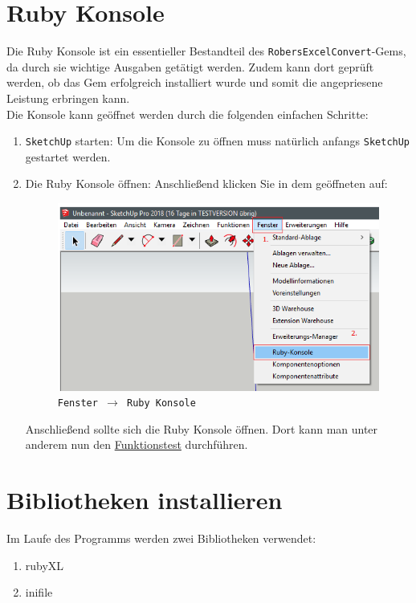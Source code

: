 \documentclass{book}
\newcommand{\sketchup}{\texttt{SketchUp}\xspace}
\newcommand{\robersexcelconvert}{\texttt{RobersExcelConvert}\xspace}
\begin{document}
		\section{Ruby Konsole} \label{Ruby Konsole}
			Die Ruby Konsole ist ein essentieller Bestandteil des \robersexcelconvert-Gems, da durch sie wichtige Ausgaben getätigt werden. Zudem kann dort geprüft werden, ob das Gem erfolgreich installiert wurde und somit die angepriesene Leistung erbringen kann.\\
			Die Konsole kann geöffnet werden durch die folgenden einfachen Schritte:
				\begin{enumerate}
					\item \sketchup starten:
						Um die Konsole zu öffnen muss natürlich anfangs \sketchup gestartet werden.
					\item Die Ruby Konsole öffnen:
						Anschließend klicken Sie in dem geöffneten auf:
						\begin{figure}[H]
							\centering
							\includegraphics[scale=0.6]{pics/Ruby-Konsole-oeffnen.png}\\
							\texttt{Fenster $\rightarrow$ Ruby Konsole}							
						\end{figure}
						Anschließend sollte sich die Ruby Konsole öffnen. Dort kann man unter anderem nun den \hyperref[Funktionstest]{Funktionstest} durchführen.
						
				\end{enumerate}
		\section{Bibliotheken installieren} \label{Installation}
			Im Laufe des Programms werden zwei Bibliotheken verwendet:\\
			\begin{enumerate}
				\item rubyXL
				\item inifile
			\end{enumerate}		
				
\end{document}
